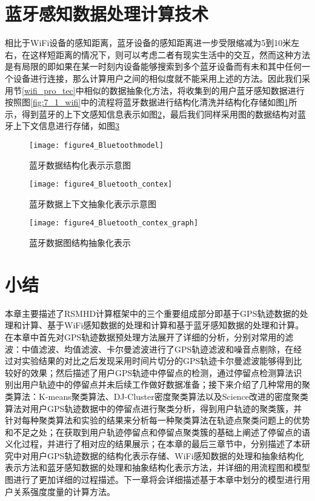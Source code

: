 \section{蓝牙感知数据处理计算技术}
相比于WiFi设备的感知距离，蓝牙设备的感知距离进一步受限缩减为5到10米左右，在这样短距离的情况下，则可以考虑二者有现实生活中的交互，然而这种方法是有局限的即如果在某一时刻内设备能够搜索到多个蓝牙设备而有未和其中任何一个设备进行连接，那么计算用户之间的相似度就不能采用上述的方法。因此我们采用节\ref{wifi_pro_tec}中相似的数据抽象化方法，将收集到的用户蓝牙感知数据进行按照图\ref{fig:7_1_wifi}中的流程将蓝牙数据进行结构化清洗并结构化存储如图\ref{fig:Bluetoothmodel}所示，得到蓝牙的上下文感知信息表示如图\ref{fig:bluetooth_context}，最后我们同样采用图的数据结构对蓝牙上下文信息进行存储，如图\ref{fig:bluetooth_context_graph}
\begin{figure}[htp]
\centering
\texttt{[image: figure4\_Bluetoothmodel]}
\caption{蓝牙数据结构化表示示意图}
\label{fig:Bluetoothmodel}
\end{figure}

\begin{figure}[htp]
\centering
\texttt{[image: figure4\_Bluetooth\_contex]}
\caption{蓝牙数据上下文抽象化表示示意图}
\label{fig:bluetooth_context}
\end{figure}

\begin{figure}[htb]
\centering
\texttt{[image: figure4\_Bluetooth\_contex\_graph]}
\caption{蓝牙数据图结构抽象化表示}
\label{fig:bluetooth_context_graph}
\end{figure}
\newpage
\section{小结}
\label{sec:section3-5}
本章主要描述了RSMHD计算框架中的三个重要组成部分即基于GPS轨迹数据的处理和计算、基于WiFi感知数据的处理和计算和基于蓝牙感知数据的处理和计算。在本章中首先对GPS轨迹数据预处理方法展开了详细的分析，分别对常用的滤波：中值滤波、均值滤波、卡尔曼滤波进行了GPS轨迹滤波和噪音点剔除，在经过对实验结果的对比之后发现采用时间片切分的GPS轨迹卡尔曼滤波能够得到比较好的效果；然后描述了用户GPS轨迹中停留点的检测，通过停留点检测算法识别出用户轨迹中的停留点并未后续工作做好数据准备；接下来介绍了几种常用的聚类算法：K-means聚类算法、DJ-Cluster密度聚类算法以及Science改进的密度聚类算法对用户GPS轨迹数据中的停留点进行聚类分析，得到用户轨迹的聚类簇，并针对每种聚类算法和实验的结果来分析每一种聚类算法在轨迹点聚类问题上的优势和不足之处；在获取到用户轨迹停留点和停留点聚类簇的基础上阐述了停留点的语义化过程，并进行了相对应的结果展示；在本章的最后三章节中，分别描述了本研究中对用户GPS轨迹数据的结构化表示存储、WiFi感知数据的处理和抽象结构化表示方法和蓝牙感知数据的处理和抽象结构化表示方法，并详细的用流程图和模型图进行了更加详细的过程描述。下一章将会详细描述基于本章中划分的模型进行用户关系强度度量的计算方法。

